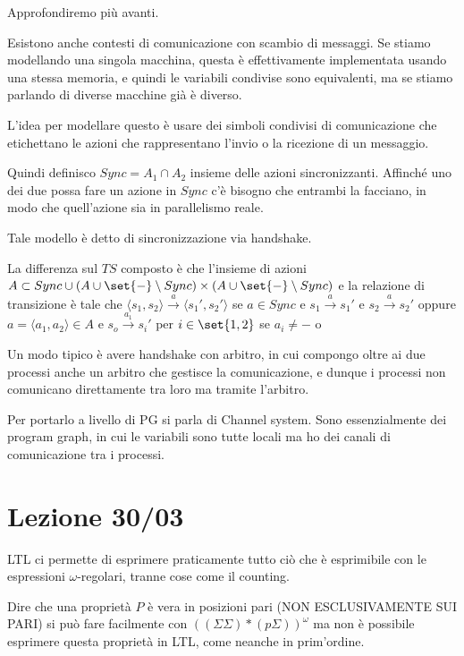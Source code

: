 Approfondiremo più avanti.

Esistono anche contesti di comunicazione con scambio di messaggi. Se stiamo modellando una singola macchina, questa è effettivamente implementata usando una stessa memoria, e quindi le variabili condivise sono equivalenti, ma se stiamo parlando di diverse macchine già è diverso.

L'idea per modellare questo è usare dei simboli condivisi di comunicazione che etichettano le azioni che rappresentano l'invio o la ricezione di un messaggio.

Quindi definisco \(Sync = A_1 \cap A_2\) insieme delle azioni sincronizzanti. Affinché uno dei due possa fare un azione in \(Sync\) c'è bisogno che entrambi la facciano, in modo che quell'azione sia in parallelismo reale.

Tale modello è detto di sincronizzazione via handshake.

La differenza sul \(TS\) composto è che l'insieme di azioni \(A \subset Sync \cup (A\cup\set{-}\setminus Sync)\times(A\cup\set{-}\setminus Sync)\) e la relazione di transizione è tale che \(\langle s_1,s_2\rangle \xrightarrow{a} \langle s_1',s_2'\rangle\) se \(a \in Sync\) e \(s_1 \xrightarrow{a} s_1'\) e \(s_2 \xrightarrow{a} s_2'\) oppure \(a = \langle a_1, a_2\rangle \in A\) e \(s_o\xrightarrow{a_1} s_i'\) per \(i \in \set{1,2}\) se \(a_i \neq -\) o %

Un modo tipico è avere handshake con arbitro, in cui compongo oltre ai due processi anche un arbitro che gestisce la comunicazione, e dunque i processi non comunicano direttamente tra loro ma tramite l'arbitro.

Per portarlo a livello di PG si parla di Channel system. Sono essenzialmente dei program graph, in cui le variabili sono tutte locali ma ho dei canali di comunicazione tra i processi.

\chapter{Lezione 30/03}

LTL ci permette di esprimere praticamente tutto ciò che è esprimibile con le espressioni \(\omega\)-regolari, tranne cose come il counting.

Dire che una proprietà \(P\) è vera in posizioni pari (NON ESCLUSIVAMENTE SUI PARI) si può fare facilmente con \({((\Sigma\Sigma)*(p\Sigma))}^\omega\) ma non è possibile esprimere questa proprietà in LTL, come neanche in prim'ordine.

